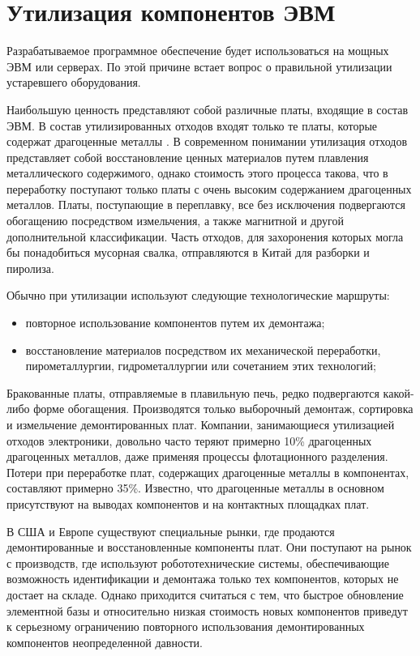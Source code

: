 \section{Утилизация компонентов ЭВМ}
Разрабатываемое программное обеспечение будет использоваться на мощных ЭВМ или серверах. По этой причине встает вопрос о правильной утилизации устаревшего оборудования.

Наибольшую ценность представляют собой различные платы, входящие в состав ЭВМ. В состав утилизированных отходов входят только те платы, которые содержат драгоценные металлы \cite[стр.~153]{utilization}. В современном понимании утилизация отходов представляет собой восстановление ценных материалов путем плавления металлического содержимого, однако стоимость этого процесса такова, что в переработку поступают только платы с очень высоким содержанием драгоценных металлов. Платы, поступающие в переплавку, все без исключения подвергаются обогащению посредством измельчения, а также магнитной и другой дополнительной классификации. Часть отходов, для захоронения которых могла бы понадобиться мусорная свалка, отправляются в Китай для разборки и пиролиза.

Обычно при утилизации используют следующие технологические маршруты:
\begin{itemize}
\item повторное использование компонентов путем их демонтажа;
\item восстановление материалов посредством их механической переработки, пирометаллургии, гидрометаллургии или сочетанием этих технологий;
\end{itemize}

Бракованные платы, отправляемые в плавильную печь, редко подвергаются какой-либо форме обогащения. Производятся только выборочный демонтаж, сортировка и измельчение демонтированных плат. Компании, занимающиеся утилизацией отходов электроники, довольно часто теряют примерно 10\% драгоценных драгоценных металлов, даже применяя процессы флотационного разделения. Потери при переработке плат, содержащих драгоценные металлы в компонентах, составляют примерно 35\%. Известно, что драгоценные металлы в основном присутствуют на выводах компонентов и на контактных площадках плат.

В США и Европе существуют специальные рынки, где продаются демонтированные и восстановленные компоненты плат. Они поступают на рынок с производств, где используют робототехнические системы, обеспечивающие возможность идентификации и демонтажа только тех компонентов, которых не достает на складе. Однако приходится считаться с тем, что быстрое обновление элементной базы и относительно низкая стоимость новых компонентов приведут к серьезному ограничению повторного использования демонтированных компонентов неопределенной давности.


